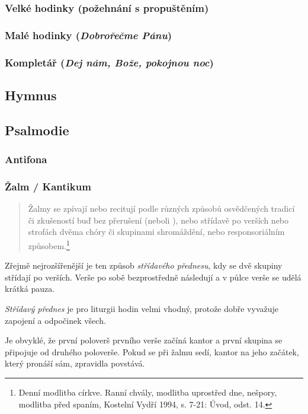 \subsubsection{Velké hodinky (požehnání s propuštěním)}
\subsubsection{Malé hodinky (\emph{Dobrořečme Pánu})}
\subsubsection{Kompletář (\emph{Dej nám, Bože, pokojnou noc})}

\subsection{Hymnus}
\label{sec:hymnus}

\subsection{Psalmodie}
\label{sec:psalmodie}
\subsubsection{Antifona}
\subsubsection{Žalm / Kantikum}

\begin{quote}
Žalmy se zpívají nebo recitují podle různých způsobů osvědčených tradicí
či zkušeností buď bez přerušení (neboli ),
nebo střídavě po verších nebo strofách dvěma chóry či skupinami
shromáždění, nebo responsoriálním způsobem.\footnote{Denní modlitba církve. Ranní chvály, modlitba uprostřed dne, nešpory, modlitba před spaním, Kostelní Vydří 1994, s. 7-21: Úvod, odst. 14.}
\end{quote}

Zřejmě nejrozšířenější je ten způsob \emph{střídavého přednesu}, 
kdy se dvě skupiny střídají po verších. Verše po sobě bezprostředně následují a 
v půlce verše se udělá krátká pauza.

\emph{Střídavý přednes} je pro liturgii hodin velmi vhodný, protože dobře 
vyvažuje zapojení a odpočinek všech.

Je obvyklé, že první poloverš prvního verše začíná kantor a první skupina
se připojuje od druhého poloverše. Pokud se při žalmu sedí, kantor
na jeho začátek, který pronáší sám, zpravidla povstává.

